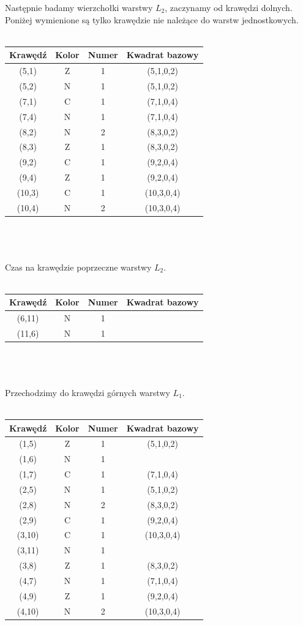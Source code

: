 \documentclass[12pt,a4paper,titlepage]{article}
\newcommand\tab[1][1cm]{\hspace*{#1}}
\begin{document}
\newpage
\tab[-0.6cm]Następnie badamy wierzchołki warstwy $L_2$, zaczynamy od krawędzi dolnych. Poniżej wymienione są tylko krawędzie nie należące do warstw jednostkowych.\\
\\
\begin{tabular}{|c|c|c|c|}\hline
Krawędź & Kolor & Numer & Kwadrat bazowy \\ \hline
(5,1) & Z & 1 & (5,1,0,2)\\ \hline
(5,2) & N & 1 & (5,1,0,2)\\ \hline
(7,1) & C & 1 & (7,1,0,4)\\ \hline 
(7,4) & N & 1 & (7,1,0,4)\\ \hline
(8,2) & N & 2 & (8,3,0,2)\\ \hline 
(8,3) & Z & 1 & (8,3,0,2)\\ \hline
(9,2) & C & 1 & (9,2,0,4)\\ \hline 
(9,4) & Z & 1 & (9,2,0,4)\\ \hline
(10,3) & C & 1 & (10,3,0,4)\\ \hline 
(10,4) & N & 2 & (10,3,0,4)\\ \hline 
\end{tabular}
\\
\\
\\
Czas na krawędzie poprzeczne warstwy $L_2$.\\
\\
\begin{tabular}{|c|c|c|c|}\hline
Krawędź & Kolor & Numer & Kwadrat bazowy \\ \hline
(6,11) & N & 1 & \\ \hline
(11,6) & N & 1 & \\ \hline 
\end{tabular}
\\
\\
\\ 
Przechodzimy do krawędzi górnych warstwy $L_1$.\\
\\
\begin{tabular}{|c|c|c|c|}\hline
Krawędź & Kolor & Numer & Kwadrat bazowy \\ \hline
(1,5) & Z & 1 & (5,1,0,2)\\ \hline
(1,6) & N & 1 & \\ \hline
(1,7) & C & 1 & (7,1,0,4)\\ \hline
(2,5) & N & 1 & (5,1,0,2)\\ \hline
(2,8) & N & 2 & (8,3,0,2)\\ \hline
(2,9) & C & 1 & (9,2,0,4)\\ \hline 
(3,10) & C & 1 & (10,3,0,4)\\ \hline 
(3,11) & N & 1 & \\ \hline
(3,8) & Z & 1 & (8,3,0,2)\\ \hline
(4,7) & N & 1 & (7,1,0,4)\\ \hline
(4,9) & Z & 1 & (9,2,0,4)\\ \hline
(4,10) & N & 2 & (10,3,0,4)\\ \hline 
\end{tabular}
\end{document}

